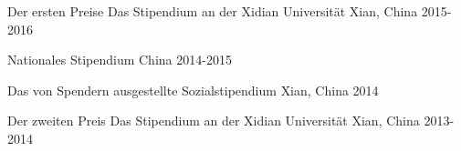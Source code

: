


\begin{cvhonors}

  \cvhonor
    {Der ersten Preise} %
    {Das Stipendium  an der Xidian Universität} %
    {Xian, China } %
    {2015-2016} %

  \cvhonor
    {Nationales Stipendium} %
    {} %
    {China } %
    {2014-2015} %

  \cvhonor
    {} %
    {Das von Spendern ausgestellte Sozialstipendium} %
   {Xian, China } %
    {2014} %

  \cvhonor
    {Der zweiten Preis} %
    {Das Stipendium  an der Xidian Universität} %
    {Xian, China } %
    {2013-2014} %
    
\end{cvhonors}





